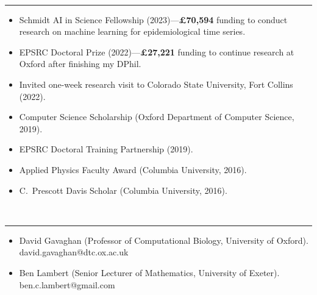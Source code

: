 \documentclass[11pt]{article}
\begin{document}
\vspace{0.5cm}


\clearpage

\vspace{-2.75mm} \\
\rule{\textwidth}{0.4pt}
\vspace{-.65cm}
\begin{itemize}[leftmargin=*]
\setlength{\itemsep}{4pt}
\setlength{\parskip}{0pt}
\setlength{\parsep}{0pt}
\item Schmidt AI in Science Fellowship (2023)---\textbf{£70,594} funding to conduct research on machine learning for epidemiological time series.
\item EPSRC Doctoral Prize (2022)---\textbf{£27,221} funding to continue research at Oxford after finishing my DPhil.
\item Invited one-week research visit to Colorado State University, Fort Collins (2022).
\item Computer Science Scholarship (Oxford Department of Computer Science, 2019).
\item EPSRC Doctoral Training Partnership (2019).
\item Applied Physics Faculty Award (Columbia University, 2016).
\item C.\ Prescott Davis Scholar (Columbia University, 2016).
\end{itemize}

\vspace{0.5cm}



\vspace{-2.75mm} \\
\rule{\textwidth}{0.4pt}
\vspace{-.65cm}
\begin{itemize}[leftmargin=*]
\setlength{\itemsep}{4pt}
\setlength{\parskip}{0pt}
\setlength{\parsep}{0pt}
\item David Gavaghan (Professor of Computational Biology, University of Oxford).\\ \hspace*{.5cm}david.gavaghan@dtc.ox.ac.uk

\item Ben Lambert (Senior Lecturer of Mathematics, University of Exeter).\\
\hspace*{.5cm}ben.c.lambert@gmail.com




\end{itemize}
\end{document}
